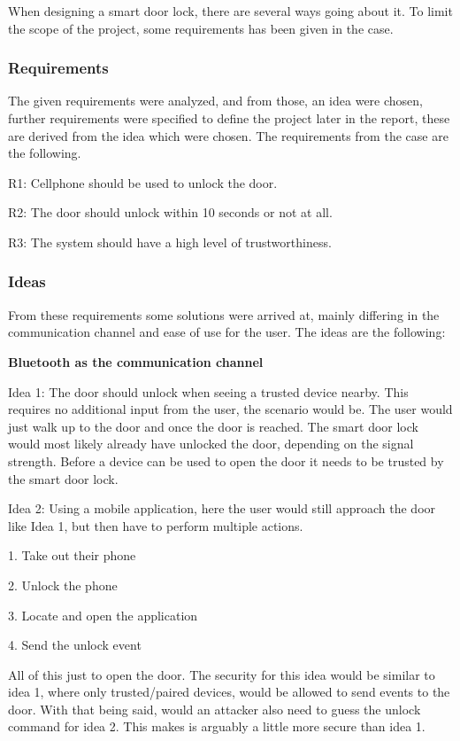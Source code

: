 When designing a smart door lock, there are several ways going about it.
To limit the scope of the project, some requirements has been given in the case.

\subsubsection{Requirements}
The given requirements were analyzed, and from those, an idea were chosen, further requirements were specified to define the project later in the report, these are derived from the idea which were chosen.
The requirements from the case are the following.
\newline

R1: Cellphone should be used to unlock the door.

R2: The door should unlock within 10 seconds or not at all.

R3: The system should have a high level of trustworthiness.

\subsubsection{Ideas}
From these requirements some solutions were arrived at, mainly differing in the communication channel and ease of use for the user.
The ideas are the following:

\textbf{Bluetooth as the communication channel}

Idea 1: The door should unlock when seeing a trusted device nearby.
This requires no additional input from the user, the scenario would be. The user would just walk up to the door and once the door is reached.
The smart door lock would most likely already have unlocked the door, depending on the signal strength.
Before a device can be used to open the door it needs to be trusted by the smart door lock.

Idea 2: Using a mobile application, here the user would still approach the door like Idea 1, but then have to perform multiple actions.
\newline

1. Take out their phone

2. Unlock the phone

3. Locate and open the application

4. Send the unlock event
\newline

All of this just to open the door.
The security for this idea would be similar to idea 1, where only trusted/paired devices, would be allowed to send events to the door. With that being said, would an attacker also need to guess the unlock command for idea 2. This makes is arguably a little more secure than idea 1.


